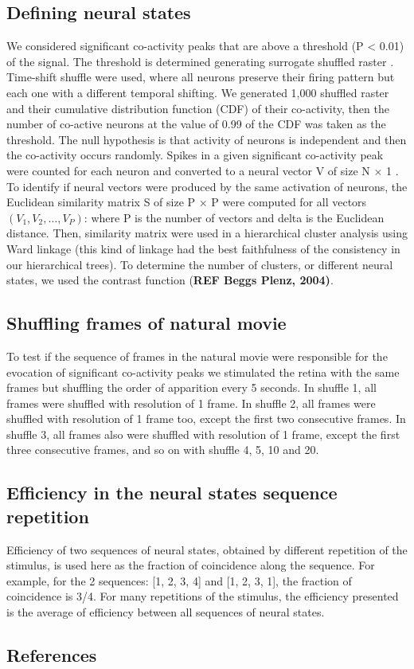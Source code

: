 \documentclass[9pt,twocolumn,twoside,lineno]{pnas-new}
\begin{document}
{\subsection*{Defining neural states}
We considered significant co-activity peaks that are above a threshold (P < 0.01) of the signal. The threshold is determined generating surrogate shuffled raster \citep{CarrilloReid:2015fm, RN3517}. Time-shift shuffle were used, where all neurons preserve their firing pattern but each one with a different temporal shifting. We generated 1,000 shuffled raster and their cumulative distribution function (CDF) of their co-activity, then the number of co-active neurons at the value of 0.99 of the CDF was taken as the threshold. The null hypothesis is that activity of neurons is independent and then the co-activity occurs randomly.
Spikes in a given significant co-activity peak were counted for each neuron and converted to a neural vector V of size N $ \times $ 1 \citep{RN3518}. To identify if neural vectors were produced by the same activation of neurons, the Euclidean similarity matrix S of size P $ \times $ P were computed for all vectors $(V_1,V_2, \dots ,V_P)$: where P is the number of vectors and delta is the Euclidean distance. Then, similarity matrix were used in a hierarchical cluster analysis using Ward linkage (this kind of linkage had the best faithfulness of the consistency in our hierarchical trees). To determine the number of clusters, or different neural states, we used the contrast function (\textbf{REF Beggs  Plenz, 2004)}.

\subsection*{Shuffling frames of natural movie}
To test if the sequence of frames in the natural movie were responsible for the evocation of significant co-activity peaks we stimulated the retina with the same frames but shuffling the order of apparition every 5 seconds. In shuffle 1, all frames were shuffled with resolution of 1 frame. In shuffle 2, all frames were shuffled with resolution of 1 frame too, except the first two consecutive frames. In shuffle 3, all frames also were shuffled with resolution of 1 frame, except the first three consecutive frames, and so on with shuffle 4, 5, 10 and 20.

\subsection*{Efficiency in the neural states sequence repetition}
Efficiency of two sequences of neural states, obtained by different repetition of the stimulus, is used here as the fraction of coincidence along the sequence. For example, for the 2 sequences: [1, 2, 3, 4] and [1, 2, 3, 1], the fraction of coincidence is 3/4. For many repetitions of the stimulus, the efficiency presented is the average of efficiency between all sequences of neural states.
}

\showmatmethods{} %


\showacknow{} %

\subsection*{References}

\end{document}

